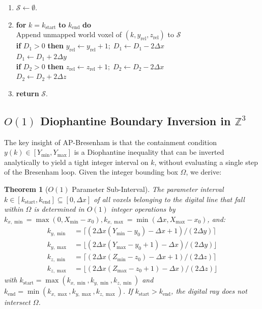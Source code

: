 \documentclass[conference]{IEEEtran}
\newtheorem{theorem}{Theorem}
\begin{document}
\begin{algorithm}[t]
\begin{footnotesize}
\begin{enumerate}
    \item $\mathcal{S} \leftarrow \emptyset$.
    \item \textbf{for} $k = k_{\mathrm{start}}$ \textbf{to} $k_{\mathrm{end}}$ \textbf{do}\\
          \quad Append unmapped world voxel of $(k, y_{\mathrm{rel}}, z_{\mathrm{rel}})$ to $\mathcal{S}$\\
          \quad \textbf{if} $D_1 > 0$ \textbf{then} $y_{\mathrm{rel}} \leftarrow y_{\mathrm{rel}} + 1; \; D_1 \leftarrow D_1 - 2\Delta x$\\
          \quad $D_1 \leftarrow D_1 + 2\Delta y$\\
          \quad \textbf{if} $D_2 > 0$ \textbf{then} $z_{\mathrm{rel}} \leftarrow z_{\mathrm{rel}} + 1; \; D_2 \leftarrow D_2 - 2\Delta x$\\
          \quad $D_2 \leftarrow D_2 + 2\Delta z$
    \item \textbf{return} $\mathcal{S}$.
\end{enumerate}
\end{footnotesize}
\end{algorithm}

\subsection{$O(1)$ Diophantine Boundary Inversion in $\mathbb{Z}^3$}
The key insight of AP-Bresenham is that the containment condition $y(k) \in [Y_{\min}, Y_{\max}]$ is a Diophantine inequality that can be inverted analytically to yield a tight integer interval on $k$, without evaluating a single step of the Bresenham loop. Given the integer bounding box $\Omega$, we derive:

\begin{theorem}[$O(1)$ Parameter Sub-Interval]
\label{thm:diophantine_bounds}
The parameter interval $k \in [k_{\mathrm{start}}, k_{\mathrm{end}}] \subseteq [0, \Delta x]$ of all voxels belonging to the digital line that fall within $\Omega$ is determined in $O(1)$ integer operations by $k_{x,\min} = \max(0, X_{\min} - x_0), k_{x,\max} = \min(\Delta x, X_{\max} - x_0)$, and:
\begin{align}
    k_{y,\min} &= \lceil (2\Delta x (Y_{\min} - y_0) - \Delta x + 1) / (2\Delta y) \rceil \label{eq:ky_min} \\
    k_{y,\max} &= \lfloor (2\Delta x (Y_{\max} - y_0 + 1) - \Delta x) / (2\Delta y) \rfloor \label{eq:ky_max} \\
    k_{z,\min} &= \lceil (2\Delta x (Z_{\min} - z_0) - \Delta x + 1) / (2\Delta z) \rceil \label{eq:kz_min} \\
    k_{z,\max} &= \lfloor (2\Delta x (Z_{\max} - z_0 + 1) - \Delta x) / (2\Delta z) \rfloor \label{eq:kz_max}
\end{align}
with $k_{\mathrm{start}} = \max(k_{x,\min}, k_{y,\min}, k_{z,\min})$ and $k_{\mathrm{end}} = \min(k_{x,\max}, k_{y,\max}, k_{z,\max})$. If $k_{\mathrm{start}} > k_{\mathrm{end}}$, the digital ray does not intersect $\Omega$.
\end{theorem}
\end{document}
